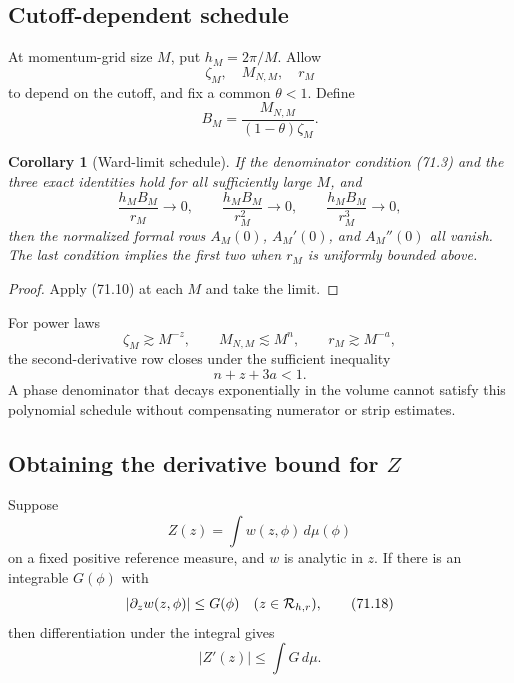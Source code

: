 \documentclass[11pt]{article}
\newtheorem{corollary}[theorem]{Corollary}
\begin{document}
\subsection{Cutoff-dependent schedule}

At momentum-grid size \(M\), put \(h_M=2\pi/M\).  Allow
\[
                         \zeta_M,\quad M_{N,M},\quad r_M       \tag{71.12}
\]
to depend on the cutoff, and fix a common \(\theta<1\).  Define
\[
                         B_M=\frac{M_{N,M}}
                                  {(1-\theta)\zeta_M}.         \tag{71.13}
\]

\begin{corollary}[Ward-limit schedule]
\label{cor:v11v71-schedule}
If the denominator condition (71.3) and the three exact identities
hold for all sufficiently large \(M\), and
\[
 \frac{h_MB_M}{r_M}\to0,\qquad
 \frac{h_MB_M}{r_M^2}\to0,\qquad
 \frac{h_MB_M}{r_M^3}\to0,                                  \tag{71.14}
\]
then the normalized formal rows \(A_M(0)\), \(A_M'(0)\), and
\(A_M''(0)\) all vanish.  The last condition implies the first two
when \(r_M\) is uniformly bounded above.
\end{corollary}

\begin{proof}
Apply (71.10) at each \(M\) and take the limit.
\end{proof}

For power laws
\[
 \zeta_M\gtrsim M^{-z},\qquad
 M_{N,M}\lesssim M^n,\qquad
 r_M\gtrsim M^{-a},                                          \tag{71.15}
\]
the second-derivative row closes under the sufficient inequality
\[
                              n+z+3a<1.                       \tag{71.16}
\]
A phase denominator that decays exponentially in the volume cannot
satisfy this polynomial schedule without compensating numerator or
strip estimates.

\subsection{Obtaining the derivative bound for \(Z\)}

Suppose
\[
                              Z(z)=\int w(z,\phi)\,d\mu(\phi) \tag{71.17}
\]
on a fixed positive reference measure, and \(w\) is analytic in \(z\).
If there is an integrable \(G(\phi)\) with
\[
                         |\partial_zw(z,\phi)|\le G(\phi)
                              \quad(z\in{\cal R}_{h,r}),       \tag{71.18}
\]
then differentiation under the integral gives
\[
                              |Z'(z)|\le\int G\,d\mu.          \tag{71.19}
\]
\end{document}
